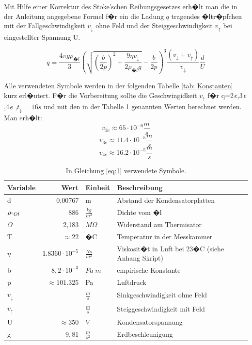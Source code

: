 \documentclass{scrartcl}
\begin{document}
Mit Hilfe einer Korrektur des Stoke'schen Reibungsgesetzes erh�lt man
die in der Anleitung angegebene Formel f�r ein die Ladung $q$
tragendes �ltr�pfchen mit der Fallgeschwindigkeit $v_{\downarrow}$ ohne
Feld und der Steiggeschwindigkeit $v_{\uparrow}$ bei eingestellter
Spannung U.

\begin{equation}
q=\frac{4\pi g\rho_{\text{�}l}}{3}\left(\sqrt{\left(\frac{b}{2p}\right)^{2}+\frac{9\eta v_{\downarrow}}{2\rho_{\text{�}l}g}}-\frac{b}{2p}\right)^{3}\frac{\left(v_{\downarrow}+v_{\uparrow}\right)}{v_{\downarrow}}\frac{d}{U}
\label{eq:1}
\end{equation}

Alle verwendeten Symbole werden in der folgenden Tabelle \ref{tab:
  Konstanten}  kurz erl�utert.
F�r die Vorbereitung sollte die Geschwingidkeit $v_{\uparrow}$ f�r q=2$\emph{e}$,3$\emph{e}$,4$\emph{e}$  ,$t_{\downarrow}=16s$ und mit den in der Tabelle 1 genannten Werten berechnet werden. Man erh�lt:
\[v_{2e}\approx 65\cdot10^{-6} \frac{m}{s}  \]
\[v_{3e}\approx 11.4\cdot10^{-5} \frac{m}{s}  \]
\[v_{4e}\approx 16.2\cdot10^{-5} \frac{m}{s} \] 

\vspace{5mm}

\begin{table}[htb!]
\begin{tabular}{| l | r | l | l |}
\hline
Variable 		& Wert 					& Einheit 			& Beschreibung \\ \hline
d 	   & 0,00767 		& m 				& Abstand der Kondensatorplatten \\
$\rho_{"Ol}$ 		& $886$ 		& $\frac{kg}{m^3}$	& Dichte vom �l \\
$\Omega$ &2,183&$M\Omega$& Widerstand am Thermisator \\
		T & $\approx 22$&�C & Temperatur in der Messkammer		\\
$\eta$	 & 			$1.8360\cdot 10^{-5}$& $\frac{Ns}{m^2}$	& Viskosit�t in Luft bei 23�C (siehe Anhang Skript) \\
b	& $8,2\cdot10^{-3}$ & $Pa\;m$					& empirische Konstante \\
p & 	$\approx101.325		$				& Pa 								& Luftdruck\\
$v_{\downarrow}$  & 		& $\frac{m}{s}$			& Sinkgeschwindigkeit ohne Feld\\
$v_{\uparrow}$	   & 					& $\frac{m}{s}$			& Steiggeschwindigkeit mit Feld\\
U								&$\approx 350$ 			& $V$ 							& Kondensatorspannung\\
g								& $9,81$ 						& $ \frac{m}{s^2}$	& Erdbeschleunigung \\
\hline
\end{tabular}
\caption{In Gleichung \eqref{eq:1} verwendete Symbole.}
\label{tab: Konstanten}
\end{table}
\end{document}
